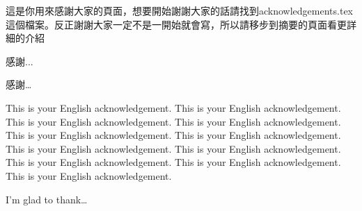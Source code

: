 
\begin{acknowledgementszh}
這是你用來感謝大家的頁面，想要開始謝謝大家的話請找到acknowledgements.tex這個檔案。反正謝謝大家一定不是一開始就會寫，所以請移步到摘要的頁面看更詳細的介紹~\par
感謝...

感謝\ldots
\end{acknowledgementszh}

\begin{acknowledgementsen}
This is your English acknowledgement. This is your English acknowledgement. This is your English acknowledgement. This is your English acknowledgement. This is your English acknowledgement. This is your English acknowledgement. This is your English acknowledgement. This is your English acknowledgement. This is your English acknowledgement. This is your English acknowledgement. This is your English acknowledgement.

I'm glad to thank\ldots 
\end{acknowledgementsen}